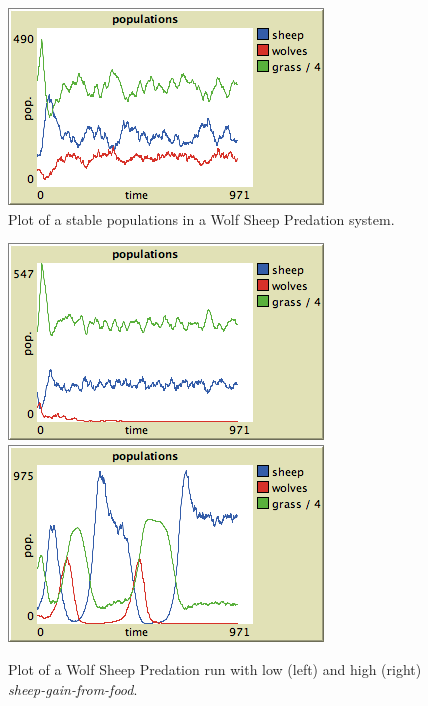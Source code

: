 \begin{figure}[ht]
\centering
\includegraphics[scale=.666667]{images/wolfsheep/wolfsheep_normal.png}
\caption{Plot of a stable populations in a Wolf Sheep Predation system.}
\label{fig:wsp_norm}
\end{figure}


\begin{figure}[ht]
\centering
\includegraphics[scale=.666667]{images/wolfsheep/sheepfood_low.png}
\includegraphics[scale=.666667]{images/wolfsheep/sheepfood_high.png}
\caption{Plot of a Wolf Sheep Predation run with low (left) and high (right) \textit{sheep-gain-from-food}.}
\label{fig:wsp_sheepfood}
\end{figure}



